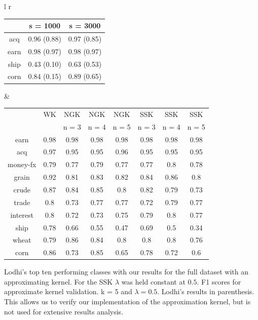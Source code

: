 \begin{tabular}{l r}
\hspace{-1.05cm}
	\begin{tabular}{| c | c | c | }\hline
		& s = 1000 & s = 3000   \\ \hline
		acq & 0.96 (0.88)& 0.97 (0.85)\\ \hline
		earn & 0.98 (0.97) & 0.98  (0.97) \\ \hline
		ship & 0.43 (0.10) & 0.63  (0.53) \\ \hline
		corn & 0.84 (0.15) & 0.89 (0.65) \\ \hline
\end{tabular} &


\begin{tabular}{| c | c | c | c | c | c | c | c |}\hline
	& WK & NGK & NGK  & NGK  & SSK & SSK& SSK \\ 
	&  & n = 3& n = 4 & n = 5 & n = 3& n = 4 & n = 5 \\ \hline
	earn & 0.98 & 0.98 &  0.98&  0.98 & 0.98 & 0.98 & 0.98 \\ \hline
	acq & 0.97 & 0.95 &  0.95 &  0.96 & 0.95 & 0.95 & 0.95 \\ \hline
	money-fx & 0.79 & 0.77 &  0.79 & 0.77 & 0.77 & 0.8 & 0.78 \\ \hline
	grain & 0.92 & 0.81 &  0.83& 0.82 & 0.84 & 0.86 & 0.8 \\ \hline
	crude & 0.87 & 0.84 &  0.85 & 0.8 & 0.82 & 0.79 & 0.73 \\ \hline
	trade & 0.8 & 0.73 &  0.77 & 0.77 & 0.72 & 0.79 & 0.77 \\ \hline
	interest & 0.8 & 0.72 &  0.73 & 0.75 & 0.79 & 0.8 & 0.77 \\ \hline
	ship & 0.78 & 0.66 &  0.55 & 0.47 & 0.69 & 0.5 & 0.34 \\ \hline
	wheat & 0.79 & 0.86 &  0.84 & 0.8 & 0.8 & 0.8 & 0.76 \\ \hline
	corn & 0.86 & 0.73 &  0.85 & 0.65 & 0.78 & 0.72 & 0.6 \\ \hline	
\end{tabular}
\end{tabular}
Lodhi's top ten performing classes with our results for the full dataset with an approximating kernel. For the SSK $ \lambda $ was held constant at $ 0.5 $. F1 scores for approximate kernel validation. k = 5 and $ \lambda = 0.5 $. Lodhi's results in parenthesis. This allows us to verify our implementation of the approximation kernel, but is not used for extensive results analysis.
